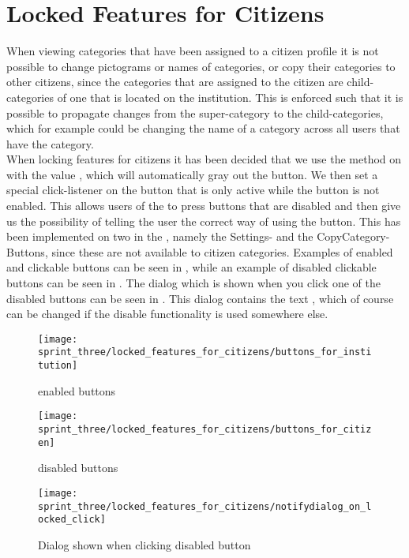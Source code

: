 
\section{Locked Features for Citizens}
\label{sec:locked_features_for_citizens}

When viewing categories that have been assigned to a citizen profile it is not possible to change pictograms or names of categories, or copy their categories to other citizens, since the categories that are assigned to the citizen are child-categories of one that is located on the institution. This is enforced such that it is possible to propagate changes from the super-category to the child-categories, which for example could be changing the name of a category across all users that have the category.\\

When locking features for citizens it has been decided that we use the  method on  with the value , which will automatically gray out the button. We then set a special click-listener on the button that is only active while the button is not enabled. This allows users of the \ct to press buttons that are disabled and then give us the possibility of telling the user the correct way of using the button. This has been implemented on two  in the \ct, namely the Settings- and the CopyCategory-Buttons, since these are not available to citizen categories. Examples of enabled and clickable buttons can be seen in , while an example of disabled clickable buttons can be seen in . The dialog which is shown when you click one of the disabled buttons can be seen in . This dialog contains the text , which of course can be changed if the disable functionality is used somewhere else. 

\begin{figure}[!htbp]
        \centering
        \texttt{[image: sprint\_three/locked\_features\_for\_citizens/buttons\_for\_institution]}
        \caption{\ct enabled buttons}
        \label{fig:ct_enabled_buttons}
\end{figure}

\begin{figure}[!htbp]
        \centering
        \texttt{[image: sprint\_three/locked\_features\_for\_citizens/buttons\_for\_citizen]}
        \caption{\ct disabled buttons}
        \label{fig:ct_disabled_buttons}
\end{figure}

\begin{figure}[!htbp]
        \centering
        \texttt{[image: sprint\_three/locked\_features\_for\_citizens/notifydialog\_on\_locked\_click]}
        \caption{Dialog shown when clicking disabled button}
        \label{fig:notifydialog_on_locked_click}
\end{figure}